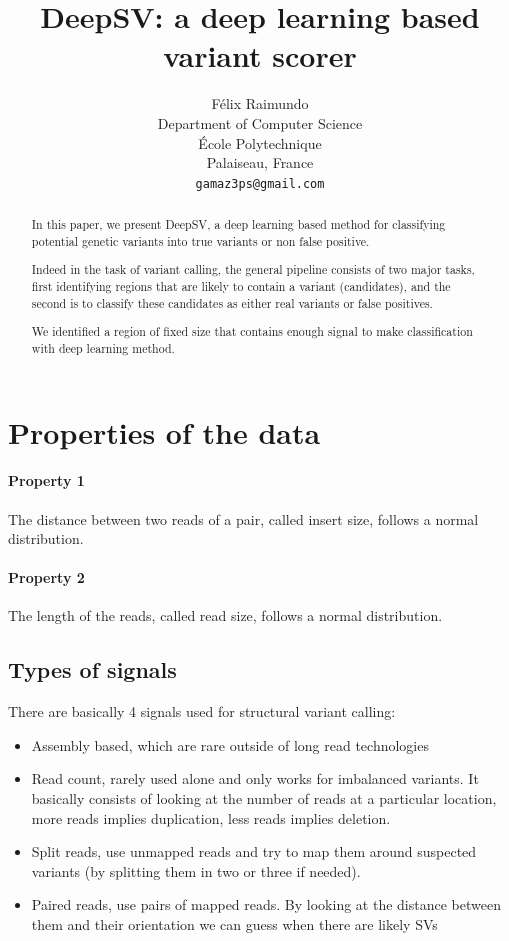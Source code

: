 \documentclass{article}
\title{DeepSV: a deep learning based variant scorer}
\author{
  Félix Raimundo\\
  Department of Computer Science\\
  École Polytechnique\\
  Palaiseau, France\\
  \texttt{gamaz3ps@gmail.com}
}
\begin{document}
\maketitle

\begin{abstract}
  In this paper, we present DeepSV, a deep learning based method for classifying
  potential genetic variants into true variants or non false positive.
  
  Indeed in the task of variant calling, the general pipeline consists of two major tasks,
  first identifying regions that are likely to contain a variant (candidates), and the second
  is to classify these candidates as either real variants or false positives.
  
  We identified a region of fixed size that contains enough signal to make classification
  with deep learning method. 
\end{abstract}

\section{Properties of the data}

\paragraph{Property 1} The distance between two reads of a pair, called insert size, follows a normal distribution.
\paragraph{Property 2} The length of the reads, called read size, follows a normal distribution.


\subsection{Types of signals}

There are basically 4 signals used for structural variant calling:

\begin{itemize}
	\item Assembly based, which are rare outside of long read technologies
	\item Read count, rarely used alone and only works for imbalanced variants. It basically consists
of looking at the number of reads at a particular location, more reads implies duplication, less
reads implies deletion.
	\item Split reads, use unmapped reads and try to map them around suspected variants (by splitting them
in two or three if needed).
	\item Paired reads, use pairs of mapped reads. By looking at the distance between them and their
orientation we can guess when there are likely SVs
\end{itemize}
\end{document}
